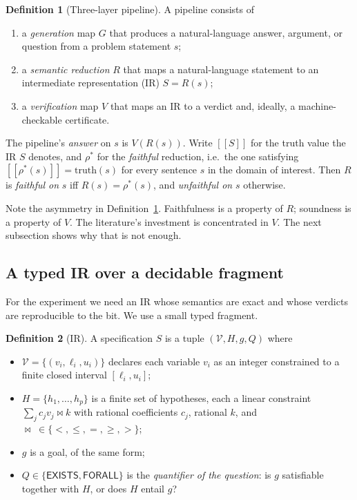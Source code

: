 \documentclass[11pt]{article}
\providecommand{\llbracket}{[\![}
\providecommand{\rrbracket}{]\!]}
\theoremstyle{definition}
\newtheorem{definition}{Definition}
\begin{document}
\begin{definition}[Three-layer pipeline]
\label{def:layers}
A pipeline consists of
\begin{enumerate}
  \item a \emph{generation} map $G$ that produces a natural-language answer,
        argument, or question from a problem statement $s$;
  \item a \emph{semantic reduction} $R$ that maps a natural-language statement to
        an intermediate representation (IR) $S = R(s)$;
  \item a \emph{verification} map $V$ that maps an IR to a verdict and, ideally, a
        machine-checkable certificate.
\end{enumerate}
The pipeline's \emph{answer} on $s$ is $V(R(s))$. Write $\llbracket S
\rrbracket$ for the truth value the IR $S$ denotes, and $\rho^\ast$ for the
\emph{faithful} reduction, i.e.\ the one satisfying $\llbracket \rho^\ast(s)
\rrbracket = \mathrm{truth}(s)$ for every sentence $s$ in the domain of interest.
Then $R$ is \emph{faithful on} $s$ iff $R(s) = \rho^\ast(s)$, and \emph{unfaithful
on} $s$ otherwise.
\end{definition}

Note the asymmetry in Definition~\ref{def:layers}. Faithfulness is a property of
$R$; soundness is a property of $V$. The literature's investment is concentrated
in $V$. The next subsection shows why that is not enough.

\subsection{A typed IR over a decidable fragment}
\label{sec:ir}

For the experiment we need an IR whose semantics are exact and whose verdicts are
reproducible to the bit. We use a small typed fragment.

\begin{definition}[IR]
\label{def:ir}
A specification $S$ is a tuple $(\mathcal{V}, H, g, Q)$ where
\begin{itemize}
  \item $\mathcal{V} = \{(v_i, \ell_i, u_i)\}$ declares each variable $v_i$ as an
        integer constrained to a finite closed interval $[\ell_i, u_i]$;
  \item $H = \{h_1, \dots, h_p\}$ is a finite set of hypotheses, each a linear
        constraint $\sum_j c_j v_j \bowtie k$ with rational coefficients $c_j$,
        rational $k$, and $\bowtie \;\in \{<, \le, =, \ge, >\}$;
  \item $g$ is a goal, of the same form;
  \item $Q \in \{\mathsf{EXISTS}, \mathsf{FORALL}\}$ is the \emph{quantifier of the
        question}: is $g$ satisfiable together with $H$, or does $H$ entail $g$?
\end{itemize}
\end{definition}
\end{document}
